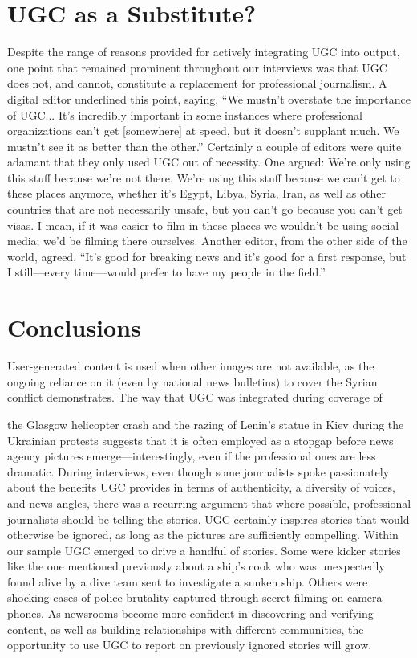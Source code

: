 \begin{enumerate}
\section{UGC as a Substitute?}
Despite the range of reasons provided for actively integrating UGC into
output, one point that remained prominent throughout our interviews was
that UGC does not, and cannot, constitute a replacement for professional
journalism. A digital editor underlined this point, saying, ``We mustn't overstate
the importance of UGC... It's incredibly important in some instances
where professional organizations can't get [somewhere] at speed, but it
doesn't supplant much. We mustn't see it as better than the other.''
Certainly a couple of editors were quite adamant that they only used UGC
out of necessity. One argued:
We're only using this stuff because we're not there. We're using this
stuff because we can't get to these places anymore, whether it's Egypt,
Libya, Syria, Iran, as well as other countries that are not necessarily
unsafe, but you can't go because you can't get visas. I mean, if it was
easier to film in these places we wouldn't be using social media; we'd
be filming there ourselves.
Another editor, from the other side of the world, agreed. ``It's good for breaking
news and it's good for a first response, but I still—every time—would
prefer to have my people in the field.''
\section{Conclusions}
User-generated content is used when other images are not available, as the
ongoing reliance on it (even by national news bulletins) to cover the Syrian
conflict demonstrates. The way that UGC was integrated during coverage of

the Glasgow helicopter crash and the razing of Lenin's statue in Kiev during
the Ukrainian protests suggests that it is often employed as a stopgap before
news agency pictures emerge—interestingly, even if the professional ones
are less dramatic. During interviews, even though some journalists spoke
passionately about the benefits UGC provides in terms of authenticity, a
diversity of voices, and news angles, there was a recurring argument that
where possible, professional journalists should be telling the stories.
UGC certainly inspires stories that would otherwise be ignored, as long as
the pictures are sufficiently compelling. Within our sample UGC emerged
to drive a handful of stories. Some were kicker stories like the one mentioned
previously about a ship's cook who was unexpectedly found alive by
a dive team sent to investigate a sunken ship. Others were shocking cases
of police brutality captured through secret filming on camera phones. As
newsrooms become more confident in discovering and verifying content, as
well as building relationships with different communities, the opportunity
to use UGC to report on previously ignored stories will grow.


\end{enumerate}
